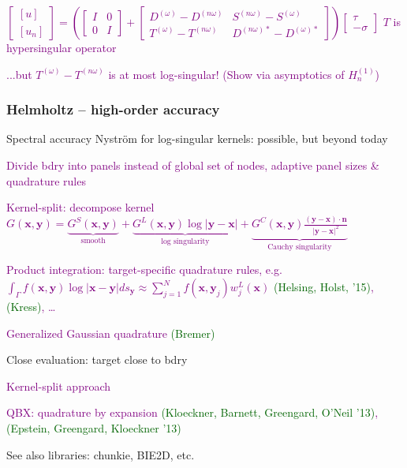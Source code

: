 \documentclass[t]{beamer}
\newcommand{\ft}[1]{\frametitle{#1}}
\newcommand{\mbf}[1]{{\bm #1}}           %
\newcommand{\who}[1]{{\scriptsize \textcolor{darkgreen}{(#1)}}}  %
\newcommand{\com}[1]{{\scriptsize \textcolor{purple}{#1}}}      %
\newcommand{\sg}{\vspace{1ex}}
\newcommand{\xx}{\mbf{x}}
\newcommand{\yy}{\mbf{y}}
\begin{document}
\begin{noframe}
  \com{$\begin{bmatrix} [u] \\ [u_n] \end{bmatrix}  = \left( \begin{bmatrix} I & 0 \\ 0 & I \end{bmatrix} + \begin{bmatrix} D^{(\omega)} - D^{(n\omega)} & S^{(n\omega)} - S^{(\omega)}\\ T^{(\omega)} - T^{(n\omega)}& D^{(n\omega)\ast} - D^{(\omega)\ast}\end{bmatrix} \right) \begin{bmatrix} \tau \\ -\sigma \end{bmatrix}$ \quad $T$ is hypersingular operator }

  \com{ ...but $T^{(\omega)} - T^{(n\omega)}$ is at most log-singular! \smiley\; (Show via asymptotics of $H_n^{(1)}$)}

\end{noframe}

\begin{frame}\ft{Helmholtz -- high-order accuracy}


  Spectral accuracy Nystr\"om for log-singular kernels: possible, but beyond today
    \sg

    \com{Divide bdry into panels instead of global set of nodes, adaptive panel sizes \& quadrature rules}

    \com{Kernel-split: decompose kernel $G(\xx, \yy) = \underbrace{G^S(\xx, \yy)}_{\text{smooth}} + \underbrace{G^L(\xx, \yy)\log|\yy - \xx|}_{\text{log singularity}} + \underbrace{G^C(\xx, \yy) \frac{(\yy - \xx) \cdot \mathbf{n}}{|\yy - \xx|^2}}_{\text{Cauchy singularity}} $}

    \com{Product integration: target-specific quadrature rules, e.g.\ $\int_{\Gamma}f(\xx, \yy)\log|\xx - \yy| ds_{\yy} \approx \sum_{j = 1}^N f(\xx, \yy_j) w_j^L(\xx)  $  \who{Helsing, Holst, '15}, \who{Kress}, \ldots} 

    \com{Generalized Gaussian quadrature \who{Bremer}}
    \sg

    Close evaluation: target close to bdry %

    \com{Kernel-split approach}

    \com{QBX: quadrature by expansion \who{Kloeckner, Barnett, Greengard, O'Neil '13}, \who{Epstein, Greengard, Kloeckner '13}}

    \sg 

  See also libraries: chunkie, BIE2D, etc.\

  \end{frame}
\end{document}
